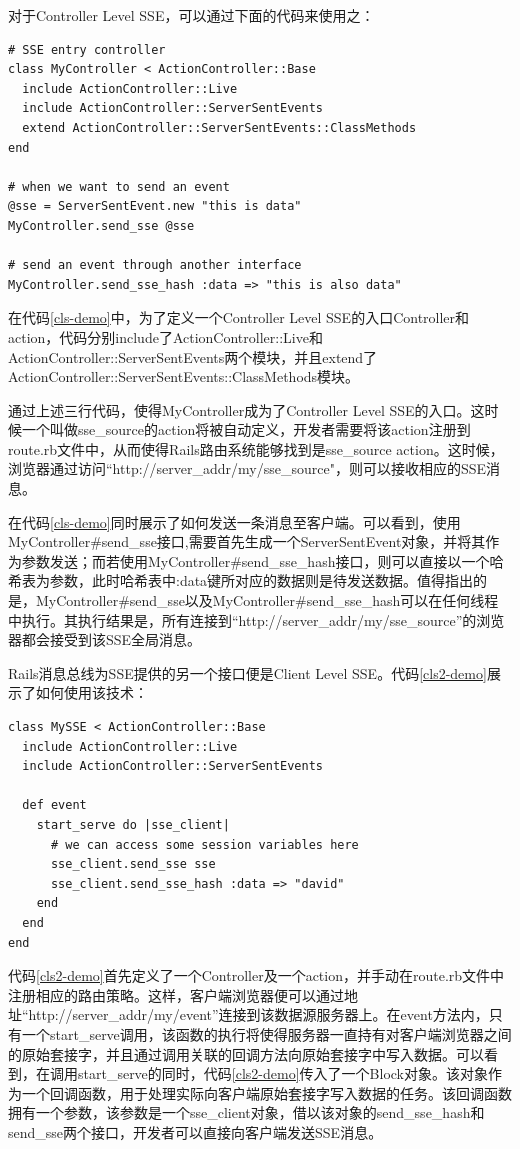 对于Controller Level SSE，可以通过下面的代码来使用之：

\begin{lstlisting}[caption={Controller Level SSE示例}, label=cls-demo]
# SSE entry controller
class MyController < ActionController::Base
  include ActionController::Live
  include ActionController::ServerSentEvents
  extend ActionController::ServerSentEvents::ClassMethods
end

# when we want to send an event
@sse = ServerSentEvent.new "this is data"
MyController.send_sse @sse

# send an event through another interface
MyController.send_sse_hash :data => "this is also data"
\end{lstlisting}

在代码\ref{cls-demo}中，为了定义一个Controller Level SSE的入口Controller和action，代码分别include了ActionController::Live和ActionController::ServerSentEvents两个模块，并且extend了ActionController::ServerSentEvents::ClassMethods模块。

通过上述三行代码，使得MyController成为了Controller Level SSE的入口。这时候一个叫做sse\_source的action将被自动定义，开发者需要将该action注册到route.rb文件中，从而使得Rails路由系统能够找到是sse\_source action。这时候，浏览器通过访问“http://server\_addr/my/sse\_source"，则可以接收相应的SSE消息。

在代码\ref{cls-demo}同时展示了如何发送一条消息至客户端。可以看到，使用MyController\#send\_sse接口,需要首先生成一个ServerSentEvent对象，并将其作为参数发送；而若使用MyController\#send\_sse\_hash接口，则可以直接以一个哈希表为参数，此时哈希表中:data键所对应的数据则是待发送数据。值得指出的是，MyController\#send\_sse以及MyController\#send\_sse\_hash可以在任何线程中执行。其执行结果是，所有连接到“http://server\_addr/my/sse\_source”的浏览器都会接受到该SSE全局消息。

Rails消息总线为SSE提供的另一个接口便是Client Level SSE。代码\ref{cls2-demo}展示了如何使用该技术：

\begin{lstlisting}[caption={Client Level SSE示例}, label=cls2-demo]
class MySSE < ActionController::Base
  include ActionController::Live
  include ActionController::ServerSentEvents

  def event
    start_serve do |sse_client|
      # we can access some session variables here
      sse_client.send_sse sse
      sse_client.send_sse_hash :data => "david"
    end
  end
end
\end{lstlisting}

代码\ref{cls2-demo}首先定义了一个Controller及一个action，并手动在route.rb文件中注册相应的路由策略。这样，客户端浏览器便可以通过地址“http://server\_addr/my/event”连接到该数据源服务器上。在event方法内，只有一个start\_serve调用，该函数的执行将使得服务器一直持有对客户端浏览器之间的原始套接字，并且通过调用关联的回调方法向原始套接字中写入数据。可以看到，在调用start\_serve的同时，代码\ref{cls2-demo}传入了一个Block对象。该对象作为一个回调函数，用于处理实际向客户端原始套接字写入数据的任务。该回调函数拥有一个参数，该参数是一个sse\_client对象，借以该对象的send\_sse\_hash和send\_sse两个接口，开发者可以直接向客户端发送SSE消息。

